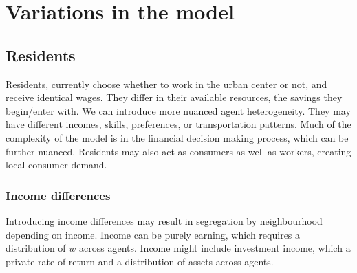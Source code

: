 
\section{Variations in the model}

\subsection{Residents}

Residents, currently choose whether to work in the urban center or not, and receive identical wages. They differ in their available resources, the savings they begin/enter with. We can introduce more nuanced agent heterogeneity. They may have different incomes, skills, preferences, or transportation patterns. Much of the complexity of the model is in the financial decision making process, which can be further nuanced. Residents may also act as consumers as well as workers, creating  local consumer demand.

\subsubsection{Income differences}

Introducing income differences may result in segregation by neighbourhood depending on income. Income can be purely earning, which requires a distribution of $w$ across agents. Income  might include investment income, which  a private rate of return and a distribution of assets across agents. 






